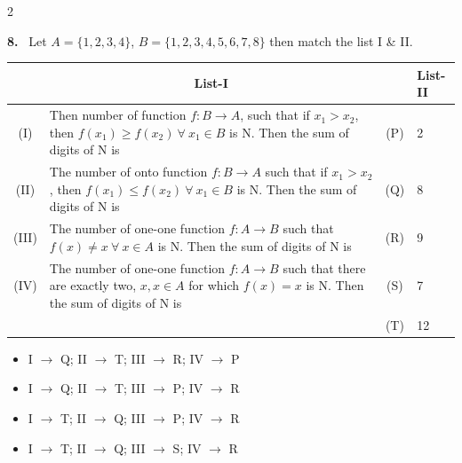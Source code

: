 \documentclass[10pt]{extarticle}
\newcommand{\qn}[1]{\par\smallskip\noindent\textbf{#1.}~}
\newenvironment{qoptions}{\begin{itemize}[leftmargin=1.8em,itemsep=1pt,topsep=2pt,label={}]}{\end{itemize}}
\newcommand{\opt}[2]{\item[(#1)] #2}
\begin{document}
\begin{multicols}{2}
\qn{8} Let $A=\{1,2,3,4\}$, $B=\{1,2,3,4,5,6,7,8\}$ then match the list I \& II.\par\nobreak
\begin{center}\small\setlength{\tabcolsep}{3pt}
\begin{tabular}{|c|p{4.2cm}|c|p{1.0cm}|}
\hline
 & \multicolumn{1}{c|}{\textbf{List-I}} & & \textbf{\footnotesize List-II} \\
\hline
(I) & Then number of function $f:B\to A$, such that if $x_1>x_2$, then $f(x_1)\ge f(x_2)\ \forall\ x_1\in B$ is N. Then the sum of digits of N is & (P) & 2 \\
\hline
(II) & The number of onto function $f:B\to A$ such that if $x_1>x_2$, then $f(x_1)\le f(x_2)\ \forall\ x_1\in B$ is N. Then the sum of digits of N is & (Q) & 8 \\
\hline
(III) & The number of one-one function $f:A\to B$ such that $f(x)\neq x\ \forall\ x\in A$ is N. Then the sum of digits of N is & (R) & 9 \\
\hline
(IV) & The number of one-one function $f:A\to B$ such that there are exactly two, $x,x\in A$ for which $f(x)=x$ is N. Then the sum of digits of N is & (S) & 7 \\
\hline
 & & (T) & 12 \\
\hline
\end{tabular}
\end{center}
\begin{qoptions}
\opt{A}{I $\to$ Q; II $\to$ T; III $\to$ R; IV $\to$ P}
\opt{B}{I $\to$ Q; II $\to$ T; III $\to$ P; IV $\to$ R}
\opt{C}{I $\to$ T; II $\to$ Q; III $\to$ P; IV $\to$ R}
\opt{D}{I $\to$ T; II $\to$ Q; III $\to$ S; IV $\to$ R}
\end{qoptions}


\end{multicols}
\end{document}
